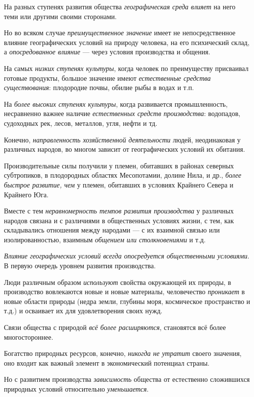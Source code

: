 \documentclass[a4paper,14pt,russian]{extreport}
\begin{document}
На разных ступенях развития общества \emph{географическая среда влияет} на него теми или другими своими сторонами.

Но во всяком случае \emph{преимущественное значение} имеет не непосредственное влияние географических условий на природу человека, на его психический склад, а \emph{опосредованное влияние} --- через условия производства и общения.

На самых \emph{низких ступенях культуры}, когда человек по преимуществу присваивал готовые продукты, большое значение имеют \emph{естественные средства существования}: плодородие почвы, обилие рыбы в водах и т.п.

На \emph{более высоких ступенях культуры}, когда развивается промышленность, несравненно важнее наличие \emph{естественных средств производства}: водопадов, судоходных рек, лесов, металлов, угля, нефти и тд.

Конечно, \emph{направленность хозяйственной деятельности} людей, неодинаковая у различных народов, во многом зависит от географических условий их обитания.

Производительные силы получили у племен, обитавших в районах северных субтропиков, в плодородных областях Месопотамии, долине Нила, и др., \emph{более быстрое развитие, чем} у племен, обитавших в условиях Крайнего Севера и Крайнего Юга.

Вместе с тем \emph{неравномерность темпов развития производства} у различных народов связана и с различиями в общественных условиях жизни, с тем, как складывались отношения между народами --- с их взаимной связью или изолированностью, взаимным \emph{общением или столкновениями} и т.д.

\emph{Влияние географических условий всегда опосредуется общественными условиями}. В первую очередь уровнем развития производства.

Люди различным образом \emph{используют} свойства окружающей их природы, в производство вовлекаются новые и новые материалы, человечество \emph{проникает} в новые области природы (недра земли, глубины моря, космическое пространство и т.д.) и осваивает их для удовлетворения своих нужд.

Связи общества с природой \emph{всё более расширяются}, становятся всё более многостороннее.

Богатство природных ресурсов, конечно, \emph{никогда не утратит} своего значения, оно входит как важный элемент в экономический потенциал страны.

Но с развитием производства \emph{зависимость} общества от естественно сложившихся природных условий относительно \emph{уменьшается}.
\end{document}

